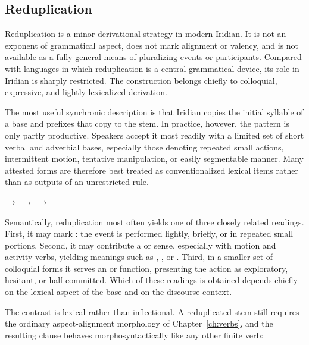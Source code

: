 \subsection{Reduplication}\label{sec:reduplication}

Reduplication is a minor derivational strategy in modern Iridian. It is not an
exponent of grammatical aspect, does not mark alignment or valency, and is not
available as a fully general means of pluralizing events or participants.
Compared with languages in which reduplication is a central grammatical device,
its role in Iridian is sharply restricted. The construction belongs chiefly to
colloquial, expressive, and lightly lexicalized derivation.

The most useful synchronic description is that Iridian copies the initial
syllable of a base and prefixes that copy to the stem. In practice, however,
the pattern is only partly productive. Speakers accept it most readily with a
limited set of short verbal and adverbial bases, especially those denoting
repeated small actions, intermittent motion, tentative manipulation, or easily
segmentable manner. Many attested forms are therefore best treated as
conventionalized lexical items rather than as outputs of an unrestricted rule.

\pex
\a {}  $\rightarrow$  
\a {}  $\rightarrow$  
\a {}  $\rightarrow$  
\xe

Semantically, reduplication most often yields one of three closely related
readings. First, it may mark : the event is
performed lightly, briefly, or in repeated small portions. Second, it may
contribute a  or  sense, especially with
motion and activity verbs, yielding meanings such as ,
, or . Third, in a smaller
set of colloquial forms it serves an  or 
function, presenting the action as exploratory, hesitant, or half-committed.
Which of these readings is obtained depends chiefly on the lexical aspect of
the base and on the discourse context.

The contrast is lexical rather than inflectional. A reduplicated stem still
requires the ordinary aspect-alignment morphology of Chapter~\ref{ch:verbs},
and the resulting clause behaves morphosyntactically like any other finite
verb:

